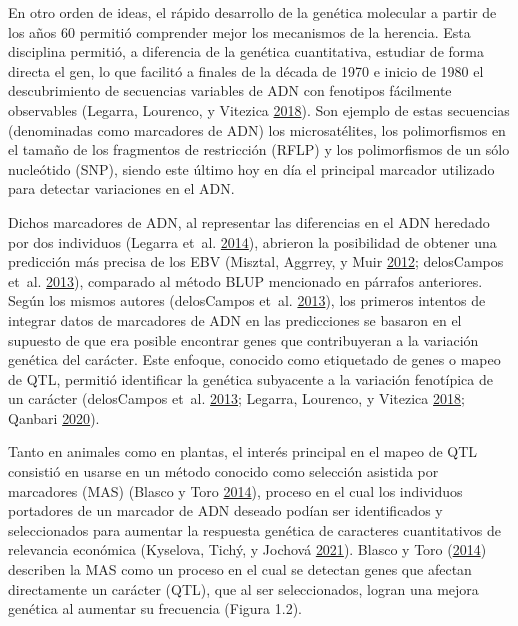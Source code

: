 \documentclass[11pt,spanish,a4paper,oneside,]{book} %
\begin{document}
En otro orden de ideas, el rápido desarrollo de la genética molecular a partir de los años 60 permitió comprender mejor los mecanismos de la herencia. Esta disciplina permitió, a diferencia de la genética cuantitativa, estudiar de forma directa el gen, lo que facilitó a finales de la década de 1970 e inicio de 1980 el descubrimiento de secuencias variables de ADN con fenotipos fácilmente observables (Legarra, Lourenco, y Vitezica \protect\hyperlink{ref-cite:30}{2018}). Son ejemplo de estas secuencias (denominadas como marcadores de ADN) los microsatélites, los polimorfismos en el tamaño de los fragmentos de restricción (RFLP) y los polimorfismos de un sólo nucleótido (SNP), siendo este último hoy en día el principal marcador utilizado para detectar variaciones en el ADN.

Dichos marcadores de ADN, al representar las diferencias en el ADN heredado por dos individuos (Legarra et~al. \protect\hyperlink{ref-cite:15}{2014}), abrieron la posibilidad de obtener una predicción más precisa de los EBV (Misztal, Aggrrey, y Muir \protect\hyperlink{ref-cite:14}{2012}; delosCampos et~al. \protect\hyperlink{ref-cite:31}{2013}), comparado al método BLUP mencionado en párrafos anteriores. Según los mismos autores (delosCampos et~al. \protect\hyperlink{ref-cite:31}{2013}), los primeros intentos de integrar datos de marcadores de ADN en las predicciones se basaron en el supuesto de que era posible encontrar genes que contribuyeran a la variación genética del carácter. Este enfoque, conocido como etiquetado de genes o mapeo de QTL, permitió identificar la genética subyacente a la variación fenotípica de un carácter (delosCampos et~al. \protect\hyperlink{ref-cite:31}{2013}; Legarra, Lourenco, y Vitezica \protect\hyperlink{ref-cite:30}{2018}; Qanbari \protect\hyperlink{ref-cite:36}{2020}).

Tanto en animales como en plantas, el interés principal en el mapeo de QTL consistió en usarse en un método conocido como selección asistida por marcadores (MAS) (Blasco y Toro \protect\hyperlink{ref-cite:3}{2014}), proceso en el cual los individuos portadores de un marcador de ADN deseado podían ser identificados y seleccionados para aumentar la respuesta genética de caracteres cuantitativos de relevancia económica (Kyselova, Tichý, y Jochová \protect\hyperlink{ref-cite:32}{2021}). Blasco y Toro (\protect\hyperlink{ref-cite:3}{2014}) describen la MAS como un proceso en el cual se detectan genes que afectan directamente un carácter (QTL), que al ser seleccionados, logran una mejora genética al aumentar su frecuencia (Figura 1.2).
\end{document}
